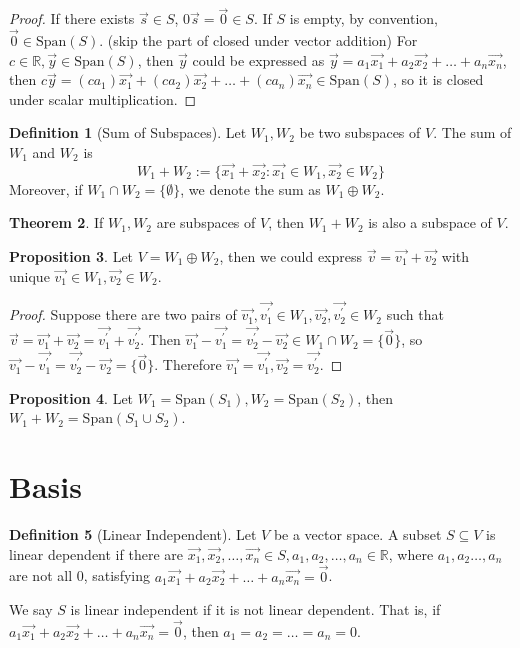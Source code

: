\documentclass{article}
\theoremstyle{definition}
\newtheorem{theorem}{Theorem}[section]
\newtheorem{proposition}[theorem]{Proposition}
\newtheorem{definition}[theorem]{Definition}
\theoremstyle{remark}
\begin{document}
\begin{proof}
    If there exists $\vec{s}\in S$, $0\vec{s}=\vec{0}\in S$.
    If $S$ is empty, by convention, $\vec{0}\in \text{Span}(S)$.
    (skip the part of closed under vector addition)
    For $c\in\mathbb{R},\vec{y}\in \text{Span}(S)$, then $\vec{y}$ could be expressed as $\vec{y}=a_1\vec{x_1}+a_2\vec{x_2}+\dots +a_n\vec{x_n}$, then $c\vec{y}=(ca_1)\vec{x_1}+(ca_2)\vec{x_2}+\dots +(ca_n)\vec{x_n}\in \text{Span}(S)$, so it is closed under scalar multiplication.
\end{proof}

\begin{definition}[Sum of Subspaces]
    Let $W_1, W_2$ be two subspaces of $V$. The sum of $W_1$ and $W_2$ is
    \[
    W_1+W_2:=\{\vec{x_1}+\vec{x_2}:\vec{x_1}\in W_1,\vec{x_2}\in W_2\}
    \]
    Moreover, if $W_1\cap W_2=\{\emptyset\}$, we denote the sum as $W_1\oplus W_2$.
\end{definition}

\begin{theorem}
    If $W_1,W_2$ are subspaces of $V$, then $W_1+W_2$ is also a subspace of $V$.
\end{theorem}

\begin{proposition}
    Let $V=W_1\oplus W_2$, then we could express $\vec{v}=\vec{v_1}+\vec{v_2}$ with unique $\vec{v_1}\in W_1, \vec{v_2}\in W_2$.
\end{proposition}

\begin{proof}
    Suppose there are two pairs of $\vec{v_1},\vec{v_1^{'}}\in W_1, \vec{v_2},\vec{v_2^{'}}\in W_2$ such that $\vec{v}=\vec{v_1}+\vec{v_2}=\vec{v_1^{'}}+\vec{v_2^{'}}$.
    Then $\vec{v_1}-\vec{v_1^{'}}=\vec{v_2^{'}}-\vec{v_2}\in W_1\cap W_2=\{\vec{0}\}$, so $\vec{v_1}-\vec{v_1^{'}}=\vec{v_2^{'}}-\vec{v_2}=\{\vec{0}\}$. Therefore $\vec{v_1}=\vec{v_1^{'}}, \vec{v_2}=\vec{v_2^{'}}$.
\end{proof}

\begin{proposition}
    Let $W_1=\text{Span}(S_1),W_2=\text{Span}(S_2)$, then $W_1+W_2=\text{Span}(S_1\cup S_2)$.
\end{proposition}

\section{Basis}

\begin{definition}[Linear Independent]
    Let $V$ be a vector space. 
    A subset $S\subseteq V$ is linear dependent if there are $\vec{x_1},\vec{x_2},\dots,\vec{x_n}\in S,a_1,a_2,\dots,a_n\in \mathbb{R}$, where $a_1,a_2\dots,a_n$ are not all 0, satisfying $a_1\vec{x_1}+a_2\vec{x_2}+\dots +a_n\vec{x_n}=\vec{0}$.

    We say $S$ is linear independent if it is not linear dependent. That is, if $a_1\vec{x_1}+a_2\vec{x_2}+\dots +a_n\vec{x_n}=\vec{0}$, then $a_1=a_2=\dots=a_n=0$.
\end{definition}
\end{document}
